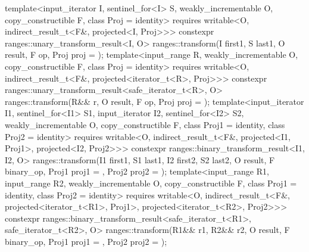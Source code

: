 \begin{itemdecl}
template<input_iterator I, sentinel_for<I> S, weakly_incrementable O,
         copy_constructible F, class Proj = identity>
  requires writable<O, indirect_result_t<F&, projected<I, Proj>>>
  constexpr ranges::unary_transform_result<I, O>
    ranges::transform(I first1, S last1, O result, F op, Proj proj = {});
template<input_range R, weakly_incrementable O, copy_constructible F,
         class Proj = identity>
  requires writable<O, indirect_result_t<F&, projected<iterator_t<R>, Proj>>>
  constexpr ranges::unary_transform_result<safe_iterator_t<R>, O>
    ranges::transform(R&& r, O result, F op, Proj proj = {});
template<input_iterator I1, sentinel_for<I1> S1, input_iterator I2, sentinel_for<I2> S2,
         weakly_incrementable O, copy_constructible F, class Proj1 = identity,
         class Proj2 = identity>
  requires writable<O, indirect_result_t<F&, projected<I1, Proj1>,
                                         projected<I2, Proj2>>>
  constexpr ranges::binary_transform_result<I1, I2, O>
    ranges::transform(I1 first1, S1 last1, I2 first2, S2 last2, O result,
                      F binary_op, Proj1 proj1 = {}, Proj2 proj2 = {});
template<input_range R1, input_range R2, weakly_incrementable O,
         copy_constructible F, class Proj1 = identity, class Proj2 = identity>
  requires writable<O, indirect_result_t<F&, projected<iterator_t<R1>, Proj1>,
                                         projected<iterator_t<R2>, Proj2>>>
  constexpr ranges::binary_transform_result<safe_iterator_t<R1>, safe_iterator_t<R2>, O>
    ranges::transform(R1&& r1, R2&& r2, O result,
                      F binary_op, Proj1 proj1 = {}, Proj2 proj2 = {});
\end{itemdecl}

